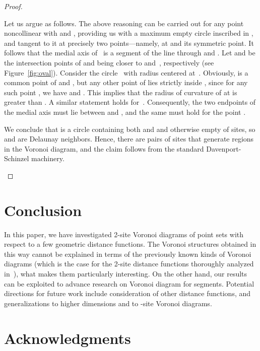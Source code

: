 \documentclass[10pt, conference, compsocconf]{IEEEtran}
\begin{document}
\begin{proof}
\begin{itemize}
      Let us argue as follows.  The above reasoning can be carried out for
      any point  noncollinear with  and , providing
      us with a maximum empty circle inscribed in , and tangent
      to it at precisely two points---namely, at  and its symmetric
      point.  It follows that the medial axis of~ is a segment
      of the line  through  and .
      Let  and  be the intersection points of  and
       being closer to  and~, respectively (see
      Figure~\ref{fig:oval}).  Consider the circle~ with radius 
      centered at~.  Obviously,  is a common point of  and
      , but any other point  of  lies strictly inside
      , since for any such point , we have  and
       .
      This implies that the radius of curvature of  at 
      is greater than .  A similar statement holds for~.
      Consequently, the two endpoints of the medial axis must lie between
       and , and the same must hold for the point .

      We conclude that  is a circle containing both  and  and
      otherwise empty of sites, so  and  are Delaunay neighbors.
      Hence, there are  pairs of sites that generate regions in
      the Voronoi diagram, and the claim follows from the standard
      Davenport-Schinzel machinery.
   \end{itemize}
\end{proof}



\section{Conclusion}

\label{S-conclusion}

In this paper, we have investigated 2-site Voronoi diagrams of point sets
with respect to a few geometric distance functions.  The Voronoi structures
obtained in this way cannot be explained in terms of the previously known
kinds of Voronoi diagrams (which is the case for the 2-site distance
functions thoroughly analyzed in~\cite{BDD02}), what makes them particularly
interesting.  On the other hand, our results can be exploited to advance
research on Voronoi diagram for segments.  Potential directions for future
work include consideration of other distance functions, and generalizations
to higher dimensions and to -site Voronoi diagrams.



\section*{Acknowledgments}
\end{document}
